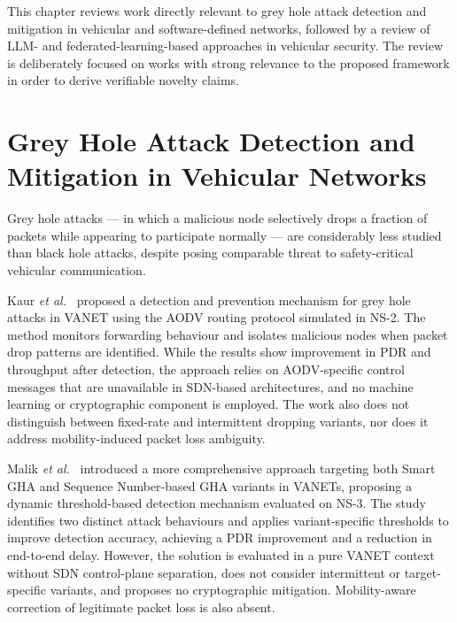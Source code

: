 \documentclass[12pt, a4paper]{report}
\begin{document}


This chapter reviews work directly relevant to grey hole attack detection and
mitigation in vehicular and software-defined networks, followed by a review of
LLM- and federated-learning-based approaches in vehicular security. The review
is deliberately focused on works with strong relevance to the proposed framework
in order to derive verifiable novelty claims.

\section{Grey Hole Attack Detection and Mitigation in Vehicular Networks}
\label{sec:lit_greyhole}

Grey hole attacks — in which a malicious node selectively drops a fraction of
packets while appearing to participate normally — are considerably less studied
than black hole attacks, despite posing comparable threat to safety-critical
vehicular communication.

Kaur \textit{et al.}~\cite{kaur2022greyhole} proposed a detection and prevention
mechanism for grey hole attacks in VANET using the AODV routing protocol
simulated in NS-2. The method monitors forwarding behaviour and isolates
malicious nodes when packet drop patterns are identified. While the results
show improvement in PDR and throughput after detection, the approach relies on
AODV-specific control messages that are unavailable in SDN-based architectures,
and no machine learning or cryptographic component is employed. The work also
does not distinguish between fixed-rate and intermittent dropping variants, nor
does it address mobility-induced packet loss ambiguity.

Malik \textit{et al.}~\cite{malik2023greyhole} introduced a more comprehensive
approach targeting both Smart GHA and Sequence Number-based GHA variants in
VANETs, proposing a dynamic threshold-based detection mechanism evaluated on
NS-3. The study identifies two distinct attack behaviours and applies
variant-specific thresholds to improve detection accuracy, achieving a PDR
improvement and a reduction in end-to-end delay. However, the solution is
evaluated in a pure VANET context without SDN control-plane separation, does not
consider intermittent or target-specific variants, and proposes no cryptographic
mitigation. Mobility-aware correction of legitimate packet loss is also absent.
\end{document}
